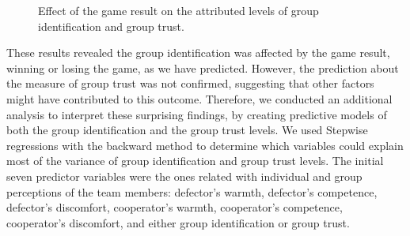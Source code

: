 \begin{figure}[ht]
\centering

\caption{Effect of the game result on the attributed levels of group identification and group trust.}
\label{fig:group}
\end{figure}

These results revealed the group identification was affected by the game result, winning or losing the game, as we have predicted. However, the prediction about the measure of group trust was not confirmed, suggesting that other factors might have contributed to this outcome. Therefore, we conducted an additional analysis to interpret these surprising findings, by creating predictive models of both the group identification and the group trust levels. We used Stepwise regressions with the backward method to determine which variables could explain most of the variance of group identification and group trust levels. The initial seven predictor variables were the ones related with individual and group perceptions of the team members: defector's warmth, defector's competence, defector's discomfort, cooperator's warmth, cooperator's competence, cooperator's discomfort, and either group identification or group trust.

